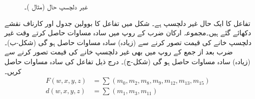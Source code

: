 \begin{figure}
\begin{subfigure}{0.33\textwidth}
\end{subfigure}\hfill
\begin{subfigure}{0.33\textwidth}
\centering
{}
\caption{}
\end{subfigure}
\caption{غیر دلچسپ حال (مثال )۔}
\label{شکل_بوولین_غیر_دلچسپ_پہلا}
\end{figure}
\quad
 تفاعل کا ایک حال غیر دلچسپ ہے۔ شکل  میں تفاعل کا بوولین جدول اور کارناف نقشے دکھائے گئے ہیں۔مجموعہ ارکان ضرب کے روپ میں سادہ مساوات حاصل کرتے وقت غیر دلچسپ خانے کی قیمت  تصور کرنے سے (زیادہ) سادہ مساوات حاصل ہو گی (شکل-ب)۔  ضرب بعد از جمع کے روپ میں بھی غیر دلچسپ خانے کی قیمت  تصور کرنے سے (زیادہ) سادہ مساوات حاصل ہو گی (شکل-ج)۔
درج ذیل تفاعل کی سادہ مساوات حاصل کریں۔	
\begin{align*}
F(w,x,y,z)&=\sum(m_0,m_2,m_8,m_9,m_{12},m_{13},m_{15})\\
d(w,x,y,z)&=\sum(m_1,m_3,m_{11})
\end{align*}
